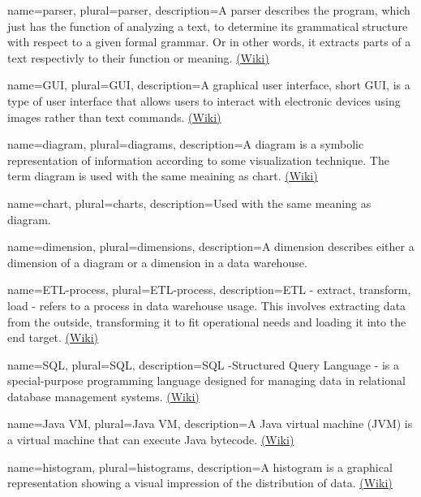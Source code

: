 {
  name=parser,
  plural=parser,
  description={A parser describes the program, which just has the function of analyzing a text, 
  to determine its grammatical structure with respect to a given formal grammar. Or in other words,
  it extracts parts of a text respectivly to their function or meaning. 
  \href{https://en.wikipedia.org/wiki/Parser}{(Wiki)} }
}


{
  name=GUI,
  plural=GUI,
  description={A graphical user interface, short GUI, is a type of user interface 
  that allows users to interact with electronic devices using images rather 
  than text commands. \href{https://en.wikipedia.org/wiki/Graphical_user_interface}{(Wiki)}}
}


{
  name=diagram,
  plural=diagrams,
  description={A diagram is a symbolic representation of information according to some
  visualization technique. The term diagram is used with the same meaining as \gls{chart}.
  \href{https://en.wikipedia.org/wiki/Diagram}{(Wiki)}}
}


{
  name=chart,
  plural=charts,
  description={Used with the same meaning as \gls{diagram}.}
}


{
  name=dimension,
  plural=dimensions,
  description={A dimension describes either a dimension of a \gls{diagram} or a dimension in a
  \gls{data warehouse}.  }
}


{
  name=ETL-process,
  plural=ETL-process,
  description={ETL - extract, transform, load - refers to a process in \gls{data warehouse} usage. This involves
  extracting data from the outside, transforming it to fit operational needs and loading it into the end target.
 \href{https://de.wikipedia.org/wiki/ETL-Prozess}{(Wiki)}}
}


{
  name=SQL,
  plural=SQL,
  description={SQL -Structured Query Language - is a special-purpose programming language designed for 
  managing data in relational \gls{database} management systems. \href{https://en.wikipedia.org/wiki/Sql}{(Wiki)}}
}


{
  name=Java VM,
  plural=Java VM,
  description={A Java virtual machine (JVM) is a virtual machine that can execute Java bytecode. 
  \href{https://en.wikipedia.org/wiki/Java_virtual_machine}{(Wiki)}}
}


{
  name=histogram,
  plural=histograms,
  description={A histogram is a graphical representation showing a visual impression of the distribution of data. 
   \href{http://en.wikipedia.org/wiki/Histogram}{(Wiki)}}
}



